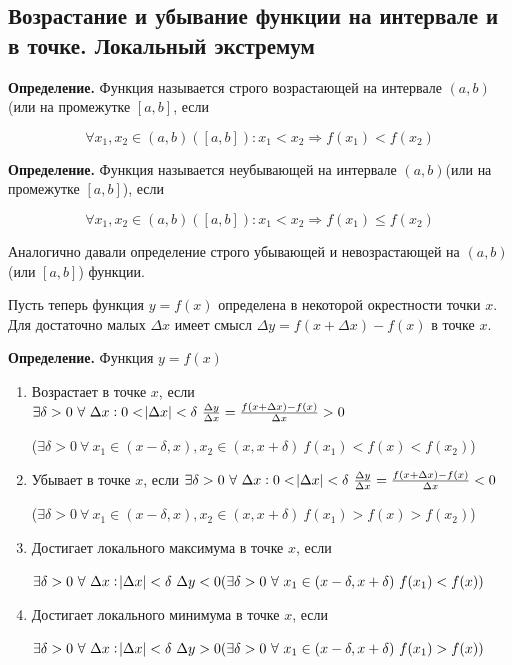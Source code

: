\documentclass{article}
\begin{document}
\subsection{Возрастание и убывание функции на интервале и в точке. Локальный экстремум}

\textbf{Определение.} Функция называется строго возрастающей на интервале \((a, b)\)(или на промежутке \([a, b]\), если

\[\forall x_1, x_2 \in (a,b)([a,b]): x_1 < x_2 \Rightarrow f(x_1) < f(x_2)\]

\textbf{Определение.} Функция называется неубывающей на интервале \((a, b)\)(или на промежутке \([a, b]\)), если

\[\forall x_1, x_2 \in (a, b)([a, b]): x_1 < x_2 \Rightarrow f(x_1) \leq f(x_2)\]

Аналогично давали определение строго убывающей и невозрастающей на \((a, b)\)(или \([a,b]\)) функции.

Пусть теперь функция \(y = f(x)\) определена в некоторой окрестности точки \(x\). Для достаточно малых \(\Delta x\) имеет смысл \(\Delta y = f(x+\Delta x) - f(x)\) в точке \(x\).

\textbf{Определение.} Функция \(y = f(x)\)

\begin{enumerate}
    \item Возрастает в точке \(x\), если \(\exists \delta > 0\ \forall\ \Delta x: 0 < \abs{\Delta x} < \delta\ \frac{\Delta y}{\Delta x} = \frac{f(x+\Delta x)-f(x)}{\Delta x} > 0\)
    
    (\(\exists \delta > 0\ \forall\ x_1 \in (x-\delta, x), x_2 \in (x, x + \delta)\ f(x_1) < f(x) < f(x_2)\))
    \item Убывает в точке \(x\), если \(\exists \delta > 0\ \forall\ \Delta x: 0 < \abs{\Delta x} < \delta\ \frac{\Delta y}{\Delta x} = \frac{f(x+\Delta x)-f(x)}{\Delta x} < 0\)
    
    (\(\exists \delta > 0\ \forall\ x_1 \in (x-\delta, x), x_2 \in (x, x + \delta)\ f(x_1) > f(x) > f(x_2)\))
    \item Достигает локального максимума в точке \(x\), если
    
    \(\exists \delta > 0\ \forall\ \Delta x: \abs{\Delta x} < \delta\ \Delta y < 0(\exists \delta > 0\ \forall\ x_1 \in (x - \delta, x + \delta)\ f(x_1) < f(x))\)
    \item Достигает локального минимума в точке \(x\), если
    
    \(\exists \delta > 0\ \forall\ \Delta x: \abs{\Delta x} < \delta\ \Delta y > 0(\exists \delta > 0\ \forall\ x_1 \in (x - \delta, x + \delta)\ f(x_1) > f(x))\)
\end{enumerate}
\end{document}
